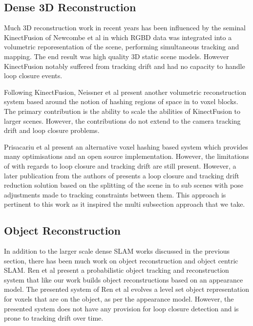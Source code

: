 \subsection*{Dense 3D Reconstruction}
Much 3D reconstruction work in recent years has been influenced by the seminal KinectFusion\cite{Newcombe2011} of Newcombe et al in which
RGBD data was integrated into a volumetric reporesentation of the scene, performing simultaneous tracking and mapping. The end result was
high quality 3D static scene models. However KinectFusion notably suffered from tracking drift and had no capacity to handle loop closure
events.

Following KinectFusion, Neissner et al present another volumetric reconstruction system\cite{Niessner2013} based around the notion of
hashing regions of space in to voxel blocks. The primary contribution is the ability to scale the abilities of KinectFusion to larger
scenes. However, the contributions do not extend to the camera tracking drift and loop closure problems.

Prisacariu et al present an alternative voxel hashing based system\cite{Prisacariu2014} which provides many optimisations and an open source 
implementation. However, the limitations of\cite{Newcombe2011,Niessner2013} with regards to loop closure and tracking drift are still present. 
However, a later publication\cite{Kahler2016} from the authors of\cite{Prisacariu2014} presents a loop closure and tracking drift reduction 
solution based on the splitting of the scene in to sub scenes with pose adjustments made to tracking constraints between them. This approach 
is pertinent to this work as it inspired the multi subsection approach that we take.

\subsection*{Object Reconstruction}
In addition to the larger scale dense SLAM works discussed in the previous section, there has been much work on object reconstruction and 
object centric SLAM. Ren et al present a probabilistic object tracking and reconstruction system\cite{Ren2013} that like our work builds 
object reconstructions based on an appearance model. The presented system of Ren et al evolves a level set object representation for voxels that 
are on the object, as per the appearance model. However, the presented system does not have any provision for loop closure detection and 
is prone to tracking drift over time.

